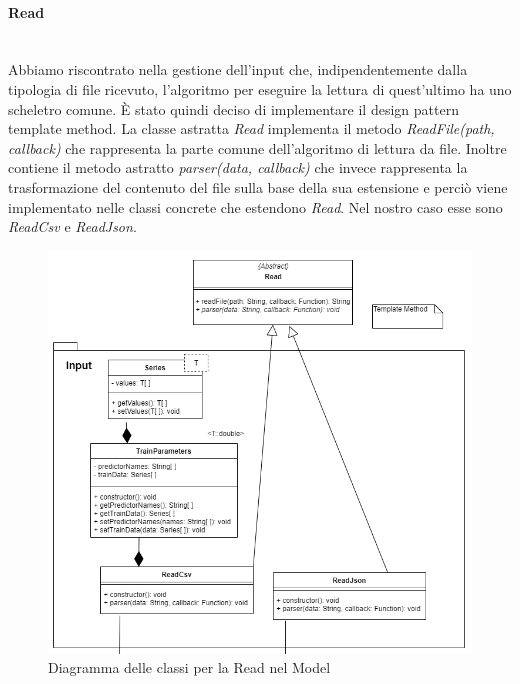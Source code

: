 		\paragraph*{Read} \mbox{} \\[1mm]
		Abbiamo riscontrato nella gestione dell'input che, indipendentemente dalla tipologia di file ricevuto, l'algoritmo per eseguire la lettura di quest'ultimo ha uno scheletro comune. È stato quindi deciso di implementare il design pattern template method.
		La classe astratta \textit{Read} implementa il metodo \textit{ReadFile(path, callback)} che rappresenta la parte comune dell'algoritmo di lettura da file. Inoltre contiene il metodo astratto \textit{parser(data, callback)} che invece rappresenta la trasformazione del contenuto del file sulla base della sua estensione e perciò viene implementato nelle classi concrete che estendono \textit{Read}. Nel nostro caso esse sono \textit{ReadCsv} e \textit{ReadJson}.
		\mbox{}
				\begin{figure} [H]
					\includegraphics[width=\linewidth]{img/Diagrammi/read-app.png}
					\caption{Diagramma delle classi per la Read nel Model}
				\end{figure}
